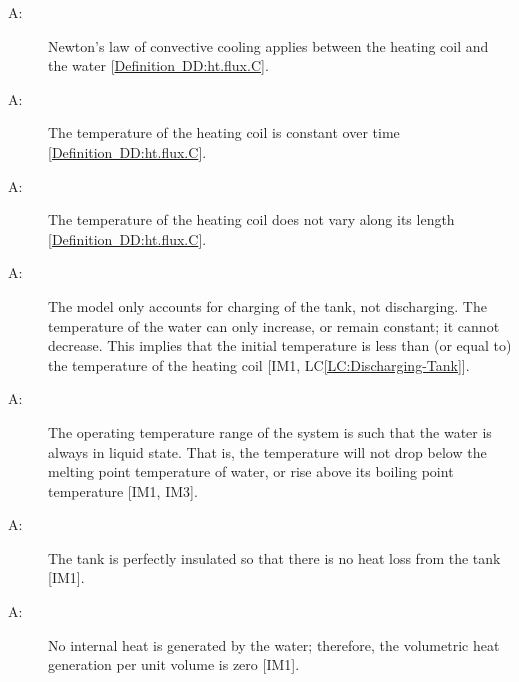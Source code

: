 \documentclass[12pt]{article}
\newcounter{assumpnum}
\newcommand{\atheassumpnum}{A\theassumpnum}
\begin{document}
\begin{description}
\item[\atheassumpnum\label{A:Newton-Law-Convective-Cooling-Coil-Water}:]Newton's law of convective cooling applies between the heating coil and the water {[}\hyperref[DD:ht.flux.C]{Definition~DD:ht.flux.C}{]}.
\end{description}
\begin{description}
\item[\atheassumpnum\label{A:Temp-Heating-Coil-Constant-over-Time}:]The temperature of the heating coil is constant over time {[}\hyperref[DD:ht.flux.C]{Definition~DD:ht.flux.C}{]}.
\end{description}
\begin{description}
\item[\atheassumpnum\label{A:Temp-Heating-Coil-Constant-over-Length}:]The temperature of the heating coil does not vary along its length {[}\hyperref[DD:ht.flux.C]{Definition~DD:ht.flux.C}{]}.
\end{description}
\begin{description}
\item[\atheassumpnum\label{A:Charging-Tank-No-Temp-Discharge}:]The model only accounts for charging of the tank, not discharging. The temperature of the water can only increase, or remain constant; it cannot decrease. This implies that the initial temperature is less than (or equal to) the temperature of the heating coil {[}IM1, LC\ref{LC:Discharging-Tank}{]}.
\end{description}
\begin{description}
\item[\atheassumpnum\label{A:Water-Always-Liquid}:]The operating temperature range of the system is such that the water is always in liquid state. That is, the temperature will not drop below the melting point temperature of water, or rise above its boiling point temperature {[}IM1, IM3{]}.
\end{description}
\begin{description}
\item[\atheassumpnum\label{A:Perfect-Insulation-Tank}:]The tank is perfectly insulated so that there is no heat loss from the tank {[}IM1{]}.
\end{description}
\begin{description}
\item[\atheassumpnum\label{A:No-Internal-Heat-Generation-By-Water}:]No internal heat is generated by the water; therefore, the volumetric heat generation per unit volume is zero {[}IM1{]}.
\end{description}
\end{document}
